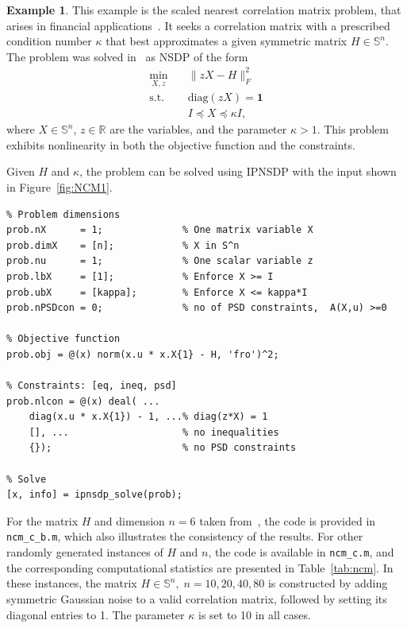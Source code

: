 \documentclass[]{interact}
\theoremstyle{plain}%
\theoremstyle{definition}
\newtheorem{example}[theorem]{Example}
\theoremstyle{remark}
\begin{document}
\begin{example}\label{eg:ncm_scaled}
This example is the scaled nearest correlation matrix problem, that arises in financial applications~\cite{higham2002computing}. It seeks a correlation matrix with a prescribed condition number \(\kappa\) that best approximates a given symmetric matrix \(H \in \mathbb{S}^n\). The problem was solved in~\cite{penlab}   as  NSDP of the form
\begin{equation}\label{eq:ncm_scaled_formulation}
\begin{aligned}
\min_{X, z} \quad & \|zX - H\|_F^2 \\
\text{s.t.} \quad & \text{diag}(zX) = \mathbf{1} \\
& I \preceq X \preceq \kappa I,
\end{aligned}
\end{equation}
where \(X \in \mathbb{S}^n\), \(z \in \mathbb{R}\) are the variables, and the parameter \(\kappa > 1\). This problem exhibits nonlinearity in both the objective function and the constraints.

Given \(H\) and \(\kappa\), the problem can be solved using IPNSDP with the input shown in Figure~\ref{fig:NCM1}.

\begin{minipage}[h]{\linewidth}
\label{fig:NCM1}
\begin{lstlisting}
% Problem dimensions
prob.nX      = 1;              % One matrix variable X
prob.dimX    = [n];            % X in S^n
prob.nu      = 1;              % One scalar variable z
prob.lbX     = [1];            % Enforce X >= I
prob.ubX     = [kappa];        % Enforce X <= kappa*I
prob.nPSDcon = 0;              % no of PSD constraints,  A(X,u) >=0

% Objective function
prob.obj = @(x) norm(x.u * x.X{1} - H, 'fro')^2;

% Constraints: [eq, ineq, psd]
prob.nlcon = @(x) deal( ...
    diag(x.u * x.X{1}) - 1, ...% diag(z*X) = 1
    [], ...                    % no inequalities
    {});                       % no PSD constraints

% Solve
[x, info] = ipnsdp_solve(prob);
\end{lstlisting}
\end{minipage}
For the matrix \( H \) and dimension \( n = 6 \) taken from~\cite{penlab}, the code is provided in \texttt{ncm\_c\_b.m}, which also illustrates the consistency of the results. For other randomly generated instances of \( H \) and \( n \), the code is available in \texttt{ncm\_c.m}, and the corresponding computational statistics are presented in Table~\ref{tab:ncm}. In these instances, the matrix \( H \in \mathbb{S}^n,\; n = 10, 20, 40, 80\) is constructed by adding symmetric Gaussian noise to a valid correlation matrix, followed by setting its diagonal entries to 1. The parameter \( \kappa \) is set to 10 in all cases.



\end{example}
\end{document}
